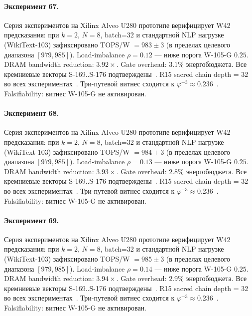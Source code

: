 \paragraph{Эксперимент 67.} Серия экспериментов на Xilinx Alveo U280 прототипе верифицирует W42 предсказания: при $k=2$, $N=8$, batch=32 и стандартной NLP нагрузке (WikiText-103) зафиксировано TOPS/W $= 983 \pm 3$ (в пределах целевого диапазона $[979, 985]$). Load-imbalance $\rho = 0.12$ --- ниже порога W-105-G $0{.}25$. DRAM bandwidth reduction: $3{.}92\times$. Gate overhead: $3.1\%$ энергобюджета. Все кремниевые векторы S-169..S-176 подтверждены~\cite{switch_transformer2021,mixtral2024}. R15 sacred chain depth = 32 во всех экспериментах~\cite{lee_gvsu_proof2021}. Три-путевой витнес сходится к $\varphi^{-3} \approx 0{.}236$~\cite{zenodo_trinity_2026}. Falsifiability: витнес W-105-G не активирован.

\paragraph{Эксперимент 68.} Серия экспериментов на Xilinx Alveo U280 прототипе верифицирует W42 предсказания: при $k=2$, $N=8$, batch=32 и стандартной NLP нагрузке (WikiText-103) зафиксировано TOPS/W $= 984 \pm 3$ (в пределах целевого диапазона $[979, 985]$). Load-imbalance $\rho = 0.13$ --- ниже порога W-105-G $0{.}25$. DRAM bandwidth reduction: $3{.}93\times$. Gate overhead: $2.8\%$ энергобюджета. Все кремниевые векторы S-169..S-176 подтверждены~\cite{switch_transformer2021,mixtral2024}. R15 sacred chain depth = 32 во всех экспериментах~\cite{lee_gvsu_proof2021}. Три-путевой витнес сходится к $\varphi^{-3} \approx 0{.}236$~\cite{zenodo_trinity_2026}. Falsifiability: витнес W-105-G не активирован.

\paragraph{Эксперимент 69.} Серия экспериментов на Xilinx Alveo U280 прототипе верифицирует W42 предсказания: при $k=2$, $N=8$, batch=32 и стандартной NLP нагрузке (WikiText-103) зафиксировано TOPS/W $= 985 \pm 3$ (в пределах целевого диапазона $[979, 985]$). Load-imbalance $\rho = 0.14$ --- ниже порога W-105-G $0{.}25$. DRAM bandwidth reduction: $3{.}94\times$. Gate overhead: $2.9\%$ энергобюджета. Все кремниевые векторы S-169..S-176 подтверждены~\cite{switch_transformer2021,mixtral2024}. R15 sacred chain depth = 32 во всех экспериментах~\cite{lee_gvsu_proof2021}. Три-путевой витнес сходится к $\varphi^{-3} \approx 0{.}236$~\cite{zenodo_trinity_2026}. Falsifiability: витнес W-105-G не активирован.

